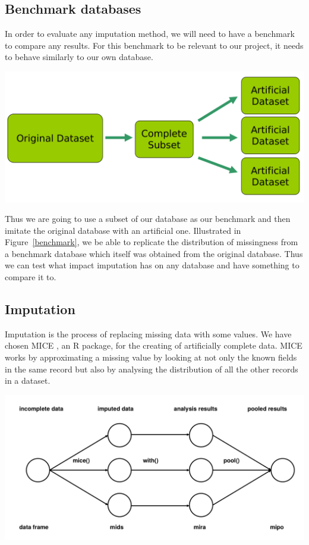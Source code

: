 \documentclass[a0,portrait]{a0poster}
\begin{document}
\begin{multicols}{2}
\subsection*{Benchmark databases}
In order to evaluate any imputation method, we will need to have a benchmark to compare any results. For this benchmark to be relevant to our project, it needs to behave similarly to our own database. 
\begin{table} %
\begin{center}
  \includegraphics[width=1\linewidth]{benchmark}
  \label{benchmark}
\end{center}
\end{table}
Thus we are going to use a subset of our database as our benchmark and then imitate the original database with an artificial one. Illustrated in Figure~\ref{benchmark}, we be able to replicate the distribution of missingness from a benchmark database which itself was obtained from the original database. Thus we can test what impact imputation has on any database and have something to compare it to.


\subsection*{Imputation} 
Imputation is the process of replacing missing data with some values\cite{imp}. We have chosen MICE \cite{imp-mice}, an R \cite{R} package, for the creating of artificially complete data. MICE works by approximating a missing value by looking at not only the known fields in the same record but also by analysing the distribution of all the other records in a dataset.

\begin{center}
  \includegraphics[width=0.5\linewidth]{mice}
  \label{mice-overview}
\end{center}


\end{multicols}
\end{document}
